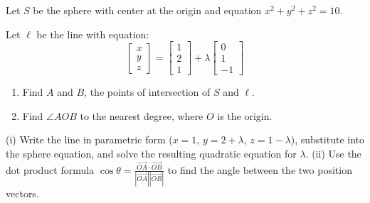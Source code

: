 \vspace{1em}

\begin{problem}
Let $S$ be the sphere with center at the origin and equation $x^2 + y^2 + z^2 = 10$.

Let $\ell$ be the line with equation:
\[
\begin{bmatrix} x \\ y \\ z \end{bmatrix} = \begin{bmatrix} 1 \\ 2 \\ 1 \end{bmatrix} + \lambda \begin{bmatrix} 0 \\ 1 \\ -1 \end{bmatrix}
\]

\begin{enumerate}[label=(\roman*)]
    \item Find $A$ and $B$, the points of intersection of $S$ and $\ell$.
    \item Find $\angle AOB$ to the nearest degree, where $O$ is the origin.
\end{enumerate}
\end{problem}

\begin{hint}
(i) Write the line in parametric form ($x = 1$, $y = 2 + \lambda$, $z = 1 - \lambda$), substitute into the sphere equation, and solve the resulting quadratic equation for $\lambda$.
(ii) Use the dot product formula $\cos\theta = \frac{\overrightarrow{OA} \cdot \overrightarrow{OB}}{|\overrightarrow{OA}||\overrightarrow{OB}|}$ to find the angle between the two position vectors.
\end{hint}


